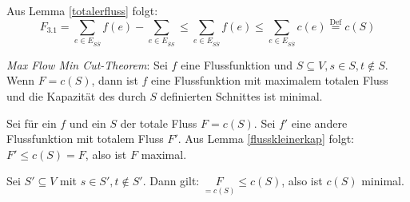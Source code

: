 \begin{beweis}
    Aus Lemma \ref{totalerfluss} folgt:
    $$ F_{3.1} = \sum_{e \in E_{S\overline{S}}} f(e) - \sum_{e \in
    E_{\overline{S}S}} \leq \sum_{e \in E_{S\overline{S}}} f(e) \leq \sum_{e
    \in E_{S\overline{S}}} c(e) \stackrel{\text{Def}}{=} c(S)$$
\end{beweis}


\begin{korollar}
    
    \emph{Max Flow Min Cut-Theorem}: Sei $f$ eine Flussfunktion und $S
    \subseteq V, s \in S, t \notin S$. Wenn $F = c(S)$, dann ist $f$ eine
    Flussfunktion mit maximalem totalen Fluss und die Kapazität des durch $S$
    definierten Schnittes ist minimal.
\end{korollar}


\begin{beweis}
    Sei für ein $f$ und ein $S$ der totale Fluss $F = c(S)$. Sei $f'$ eine
    andere Flussfunktion mit totalem Fluss $F'$. Aus Lemma
    \ref{flusskleinerkap} folgt: $F' \leq c(S) = F$, also ist $F$ maximal.

    Sei $S' \subseteq V$ mit $s \in S', t \notin S'$. Dann gilt:
    $\underset{=c(S)}{F} \leq c(S)$, also ist $c(S)$ minimal.
\end{beweis}



